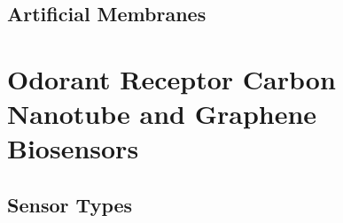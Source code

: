 \documentclass[
  a4paper,
]{scrbook}
\begin{document}
\hypertarget{sec-artificial-membranes}{%
\subsection{Artificial Membranes}\label{sec-artificial-membranes}}

\hypertarget{odorant-receptor-carbon-nanotube-and-graphene-biosensors}{%
\section{Odorant Receptor Carbon Nanotube and Graphene
Biosensors}\label{odorant-receptor-carbon-nanotube-and-graphene-biosensors}}

\hypertarget{sensor-types}{%
\subsection{Sensor Types}\label{sensor-types}}

\newpage
{}
\end{document}
